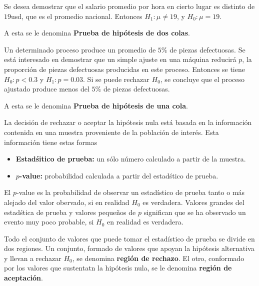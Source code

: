 \begin{frame}
\begin{frame}
\begin{itemize}
\end{itemize}







\begin{Ejem}
Se desea demostrar que el salario promedio  por hora en cierto lugar es distinto de $19$usd, que es el promedio nacional. Entonces $H_{1}:\mu\neq19$, y $H_{0}:\mu=19$.
\end{Ejem}
A esta se le denomina \textbf{Prueba de hip\'otesis de dos colas}.


\begin{Ejem}
Un determinado proceso produce un promedio de $5\%$ de piezas defectuosas. Se est\'a interesado en demostrar que un simple ajuste en una m\'aquina reducir\'a $p$, la proporci\'on de piezas defectuosas producidas en este proceso. Entonces se tiene $H_{0}:p<0.3$ y $H_{1}:p=0.03$. Si se puede rechazar $H_{0}$, se concluye que el proceso ajustado produce menos del $5\%$ de piezas defectuosas.
\end{Ejem}
A esta se le denomina \textbf{Prueba de hip\'otesis de una cola}.






La decisi\'on de rechazar o aceptar la hip\'otesis nula est\'a basada en la informaci\'on contenida en una muestra proveniente de la poblaci\'on de inter\'es. Esta informaci\'on tiene estas formas

\begin{itemize}
\item \textbf{Estad\'sitico de prueba:} un s\'olo n\'umero calculado a partir de la muestra.

\item \textbf{$p$-value:} probabilidad calculada a partir del estad\'stico de prueba.

\end{itemize}






\begin{Def}
El $p$-value es la probabilidad de observar un estad\'istico de prueba tanto o m\'as alejado del valor obervado, si en realidad $H_{0}$ es verdadera.\medskip
Valores grandes del estad\'stica de prueba  y valores peque\~nos de $p$ significan que se ha observado un evento muy poco probable, si $H_{0}$ en realidad es verdadera.
\end{Def}

Todo el conjunto de valores que puede tomar el estad\'istico de prueba se divide en dos regiones. Un conjunto, formado de valores que apoyan la hip\'otesis alternativa y llevan a rechazar $H_{0}$, se denomina \textbf{regi\'on de rechazo}. El otro, conformado por los valores que sustentatn la hip\'otesis nula, se le denomina \textbf{regi\'on de aceptaci\'on}.\medskip








\end{frame}
\end{frame}
